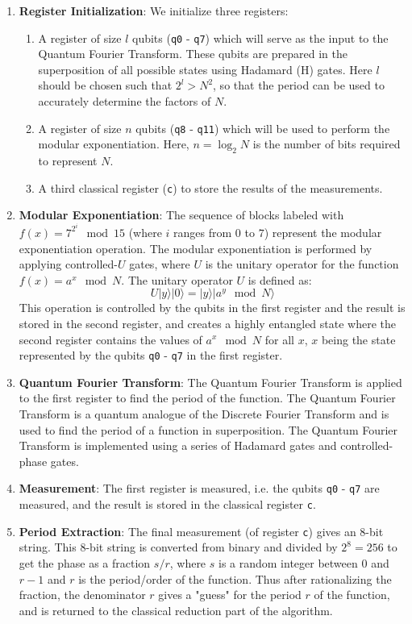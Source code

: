 \documentclass[12pt]{article}
\begin{document}
\begin{enumerate}
    \item \textbf{Register Initialization}: We initialize three registers:
    \begin{enumerate}
        \item A register of size $l$ qubits (\texttt{q0} - \texttt{q7}) which will serve as the input to the Quantum Fourier Transform. These qubits are prepared in the superposition of all possible states using Hadamard (H) gates. Here $l$ should be chosen such that $2^l > N^2$, so that the period can be used to accurately determine the factors of $N$.
        \item A register of size $n$ qubits (\texttt{q8} - \texttt{q11}) which will be used to perform the modular exponentiation. Here, $n=\log_2 N$ is the number of bits required to represent $N$.
        \item A third classical register (\texttt{c}) to store the results of the measurements.
    \end{enumerate}
    \item \textbf{Modular Exponentiation}: The sequence of blocks labeled with $f(x) = 7^{2^i} \mod 15$ (where $i$ ranges from $0$ to $7$) represent the modular exponentiation operation. The modular exponentiation is performed by applying controlled-$U$ gates, where $U$ is the unitary operator for the function $f(x) = a^x \mod N$. The unitary operator $U$ is defined as:
    $$U|y\rangle|0\rangle = |y\rangle|a^y \mod N\rangle$$
    This operation is controlled by the qubits in the first register and the result is stored in the second register, and creates a highly entangled state where the second register contains the values of $a^x \mod N$ for all $x$, $x$ being the state represented by the qubits \texttt{q0} - \texttt{q7} in the first register.
    \item \textbf{Quantum Fourier Transform}: The Quantum Fourier Transform is applied to the first register to find the period of the function. The Quantum Fourier Transform is a quantum analogue of the Discrete Fourier Transform and is used to find the period of a function in superposition. The Quantum Fourier Transform is implemented using a series of Hadamard gates and controlled-phase gates.
    \item \textbf{Measurement}: The first register is measured, i.e. the qubits \texttt{q0} - \texttt{q7} are measured, and the result is stored in the classical register \texttt{c}.
    \item \textbf{Period Extraction}: The final measurement (of register \texttt{c}) gives an 8-bit string. This 8-bit string is converted from binary and divided by $2^8=256$ to get the phase as a fraction $s/r$, where $s$ is a random integer between $0$ and $r-1$ and $r$ is the period/order of the function. Thus after rationalizing the fraction, the denominator $r$ gives a "guess" for the period $r$ of the function, and is returned to the classical reduction part of the algorithm.
\end{enumerate}
\end{document}
